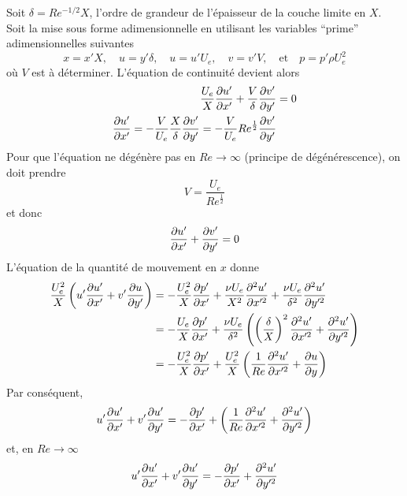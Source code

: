       Soit $\delta = Re^{-1/2} X$, l'ordre de grandeur de l'épaisseur de la couche limite en $X$. Soit la mise sous forme adimensionnelle en utilisant les variables ``prime'' adimensionnelles suivantes
      \begin{equation}
        x = x'X, \quad u=y' \delta, \quad u = u'U_e, \quad v = v' V, \quad \textrm{et} \quad p = p' \rho U_e^2
      \end{equation}
      où $V$ est à déterminer. L'équation de continuité devient alors
      \begin{equation}
        \begin{aligned}
          \frac{U_e}{X} \pdv{u'}{x'} + \frac{V}{\delta} \pdv{v'}{y'} &= 0\\
          \pdv{u'}{x'} = -\frac{V}{U_e} \frac{X}{\delta}\pdv{v'}{y'} = -\frac{V}{U_e}Re^{\frac{1}{2}}\pdv{v'}{y'}
        \end{aligned}
      \end{equation}
      Pour que l'équation ne dégénère pas en $Re \rightarrow \infty$ (principe de dégénérescence), on doit prendre
      \begin{equation}
        V  = \frac{U_e}{Re^{\frac{1}{2}}}
      \end{equation}
      et donc
      \begin{equation}
        \pdv{u'}{x'} + \pdv{v'}{y'} = 0
      \end{equation}
      L'équation de la quantité de mouvement en $x$ donne
      \begin{equation}
        \begin{aligned}
          \frac{U_e^2}{X} \left(u' \pdv{u'}{x'} + v' \pdv{u}{y'}\right) &= - \frac{U_e^2}{X}\pdv{p'}{x'} + \frac{\nu U_e}{X^2}\frac{\partial^2 u^\prime}{\partial x^{\prime 2}} + \frac{\nu U_e}{\delta^2} \frac{\partial^2 u^\prime}{\partial y^{\prime 2}}\\
          &= - \frac{U_e}{X}\pdv{p'}{x'} + \frac{\nu U_e}{\delta^2} \left(\left(\frac{\delta}{X}\right)^2 \frac{\partial^2 u^\prime}{\partial x^{\prime 2}} + \frac{\partial^2 u^\prime}{\partial y^{\prime 2}}\right)\\
          &= - \frac{U_e^2}{X}\pdv{p'}{x'} + \frac{U_e^2}{X} \left(\frac{1}{Re}\frac{\partial^2 u^\prime}{\partial x^{\prime 2}} + \pdv{u}{y}\right)
        \end{aligned}
      \end{equation}
      Par conséquent,
      \begin{equation}
        u'\pdv{u'}{x'} + v'\pdv{u'}{y'} = -\pdv{p'}{x'} + \left(\frac{1}{Re} \frac{\partial^2 u^\prime}{\partial x^{\prime 2}} + \frac{\partial^2 u^\prime}{\partial y^{\prime 2}}\right)
      \end{equation}
      et, en $Re \rightarrow \infty$
      \begin{equation}
        u'\pdv{u'}{x'} + v'\pdv{u'}{y'} = -\pdv{p'}{x'} + \frac{\partial^2 u^\prime}{\partial y^{\prime 2}}
      \end{equation}

